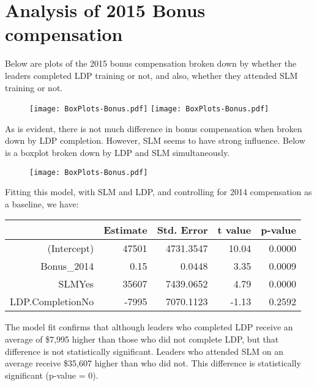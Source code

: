 \documentclass[11pt]{extarticle} %
\begin{document}
\section{Analysis of 2015 Bonus compensation}
Below are plots of the 2015 bonus compensation broken down by whether the leaders completed LDP training or not, and also, whether they attended SLM training or not.
\begin{figure}[H]
\centering 
\texttt{[image: BoxPlots-Bonus.pdf]}
\texttt{[image: BoxPlots-Bonus.pdf]}
\end{figure}
As is evident, there is not much difference in bonus compensation when broken down by LDP completion. However, SLM seems to have strong influence. Below is a boxplot broken down by LDP and SLM simultaneously.
\begin{figure}[H]
\centering 
\texttt{[image: BoxPlots-Bonus.pdf]}
\end{figure}
Fitting this model, with SLM and LDP, and controlling for 2014 compensation as a baseline, we have:
\begin{table}[H]
\centering
\begin{tabular}{rrrrr}
  \hline
 & Estimate & Std. Error & t value & p-value \\ 
  \hline
  (Intercept) & 47501 & 4731.3547 & 10.04 & 0.0000 \\ 
  Bonus\_2014 & 0.15 & 0.0448 & 3.35 & 0.0009 \\ 
  SLMYes & 35607 & 7439.0652 & 4.79 & 0.0000 \\ 
  LDP.CompletionNo & -7995 & 7070.1123 & -1.13 & 0.2592 \\ 
  \hline
\end{tabular}
\end{table}
The model fit confirms that although leaders who completed LDP receive an average of \$7,995 higher than those who did not complete LDP, but that difference is not statistically significant. Leaders who attended SLM on an average receive \$35,607 higher than who did not. This difference is statistically significant (p-value = 0).
\end{document}
